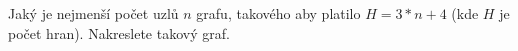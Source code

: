 Jaký je nejmenší počet uzlů $n$ grafu, takového aby platilo $H=3*n + 4$ (kde $H$
je počet hran). Nakreslete takový graf.
